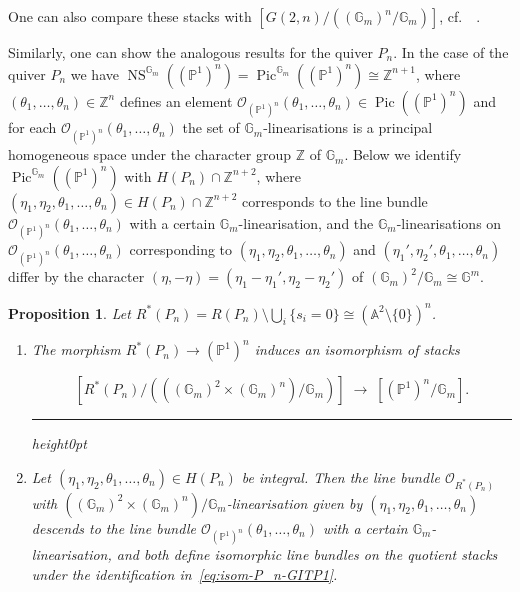 \documentclass[10pt,a4paper]{amsart}
\newcommand{\cf}{cf.\ }
\newtheorem{prop}[theo]{Proposition}
\theoremstyle{definition}
\def\Z{\mathds Z}
\def\A{\mathds A}
\def\G{\mathds G}
\def\P{\mathds P}
\def\O{\mathcal O}
\newenvironment{equationi}{\par\noindent\vspace*{\abovedisplayskip}\begin{minipage}{\linewidth}
\begin{equation}}{\end{equation}\end{minipage}\hrule height0pt\leavevmode}
\DeclareMathOperator{\Pic}{Pic}
\DeclareMathOperator{\NS}{NS}
\begin{document}
One can also compare these stacks with $[G(2,n)/((\G_m)^n/\G_m)]$,
\cf~\cite[2.4]{Ka93a}.


Similarly, one can show the analogous results for the quiver $P_n$.
In the case of the quiver $P_n$ we have
$\NS^{\G_m}((\P^1)^n)=\Pic^{\G_m}((\P^1)^n)\cong\Z^{n+1}$, 
where $(\theta_1,\dots,\theta_n)\in\Z^n$ defines an element
$\O_{(\P^1)^n}(\theta_1,\ldots,\theta_n)\in\Pic((\P^1)^n)$ and
for each $\O_{(\P^1)^n}(\theta_1,\ldots,\theta_n)$ the set of $\G_m$-linearisations
is a principal homogeneous space under the character group $\Z$ of $\G_m$.
Below we identify $\Pic^{\G_m}((\P^1)^n)$ with $H(P_n)\cap\Z^{n+2}$, where
$(\eta_1,\eta_2,\theta_1,\ldots,\theta_n)\in H(P_n)\cap\Z^{n+2}$ corresponds 
to the line bundle $\O_{(\P^1)^n}(\theta_1,\ldots,\theta_n)$ with a certain
$\G_m$-linearisation, and the $\G_m$-linearisations on 
$\O_{(\P^1)^n}(\theta_1,\ldots,\theta_n)$ corresponding 
to $(\eta_1,\eta_2,\theta_1,\ldots,\theta_n)$ and 
$(\eta_1',\eta_2',\theta_1,\ldots,\theta_n)$ differ by the character
$(\eta,-\eta)=(\eta_1-\eta_1',\eta_2-\eta_2')$ of $(\G_m)^2/\G_m\cong\G^m$.

\begin{prop}\label{prop:P_n-GITP1}
Let $R^*(P_n)=R(P_n)\setminus\bigcup_i\{s_i=0\}\cong(\A^2\setminus\{0\})^n$.%

\begin{enumerate}[label=(\alph*)]
\item\label{prop2.11_a} 
The morphism $R^*(P_n)\to(\P^1)^n$ induces an isomorphism of stacks
\begin{equationi}\label{eq:isom-P_n-GITP1}
[R^*(P_n)/(((\G_m)^2\times(\G_m)^n)/\G_m)]\;\to\;[(\P^1)^n/\G_m].
\end{equationi}

\item\label{prop2.11_b} 
Let $(\eta_1,\eta_2,\theta_1,\ldots,\theta_n)\in H(P_n)$ be integral. 
Then the line bundle $\O_{R^*(P_n)}$ with
$((\G_m)^2\times(\G_m)^n)/\G_m$-linearisation
given by $(\eta_1,\eta_2,\theta_1,\ldots,\theta_n)$ descends to the line bundle 
$\O_{(\P^1)^n}(\theta_1,\ldots,\theta_n)$ with a certain $\G_m$-linearisation, and both 
define isomorphic line bundles on the quotient stacks under the identification 
in~\eqref{eq:isom-P_n-GITP1}.
\end{enumerate}
\end{prop}
\end{document}
